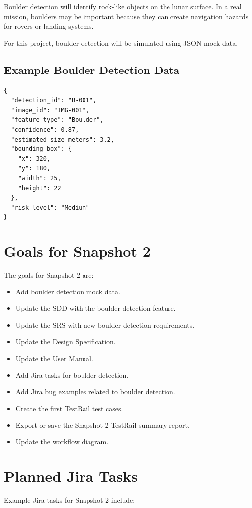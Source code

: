 \documentclass[12pt]{article}
\begin{document}
Boulder detection will identify rock-like objects on the lunar surface. In a real mission, boulders may be important because they can create navigation hazards for rovers or landing systems.

For this project, boulder detection will be simulated using JSON mock data.

\subsection{Example Boulder Detection Data}

\begin{verbatim}
{
  "detection_id": "B-001",
  "image_id": "IMG-001",
  "feature_type": "Boulder",
  "confidence": 0.87,
  "estimated_size_meters": 3.2,
  "bounding_box": {
    "x": 320,
    "y": 180,
    "width": 25,
    "height": 22
  },
  "risk_level": "Medium"
}
\end{verbatim}

\section{Goals for Snapshot 2}

The goals for Snapshot 2 are:

\begin{itemize}
    \item Add boulder detection mock data.
    \item Update the SDD with the boulder detection feature.
    \item Update the SRS with new boulder detection requirements.
    \item Update the Design Specification.
    \item Update the User Manual.
    \item Add Jira tasks for boulder detection.
    \item Add Jira bug examples related to boulder detection.
    \item Create the first TestRail test cases.
    \item Export or save the Snapshot 2 TestRail summary report.
    \item Update the workflow diagram.
\end{itemize}

\section{Planned Jira Tasks}

Example Jira tasks for Snapshot 2 include:
\end{document}
